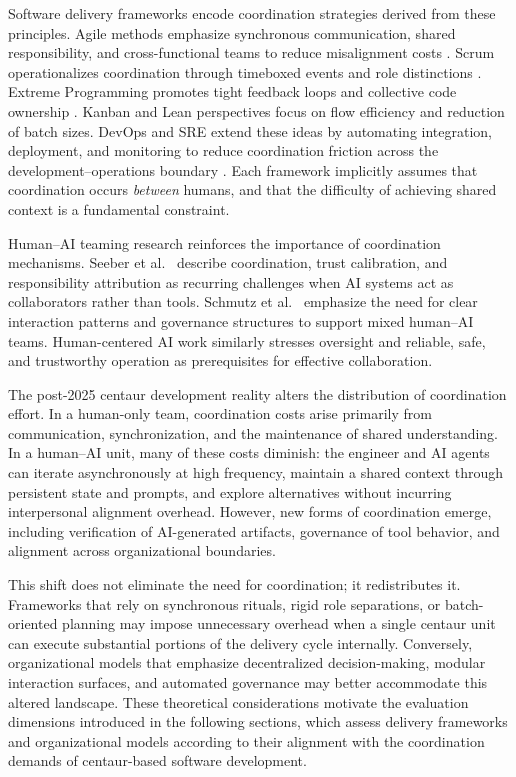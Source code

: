 \documentclass[11pt, a4paper, twocolumn]{article} %
\begin{document}
Software delivery frameworks encode coordination strategies derived from these
principles. Agile methods emphasize synchronous communication, shared
responsibility, and cross-functional teams to reduce misalignment costs
\citep{cockburn2001,highsmith2002agile}. Scrum operationalizes coordination
through timeboxed events and role distinctions \citep{schwaber2017scrum}. Extreme
Programming promotes tight feedback loops and collective code ownership
\citep{beck1999xp}. Kanban \citep{anderson2010kanban} and Lean perspectives focus
on flow efficiency and reduction of batch sizes. DevOps and SRE extend these
ideas by automating integration, deployment, and monitoring to reduce
coordination friction across the development--operations boundary
\citep{forsgren2018accelerate,humble2015leanenterprise}. Each framework implicitly
assumes that coordination occurs \emph{between} humans, and that the difficulty
of achieving shared context is a fundamental constraint.

\newpage

Human--AI teaming research reinforces the importance of coordination mechanisms.
Seeber et al.\ \citep{seeber2020machines} describe coordination, trust
calibration, and responsibility attribution as recurring challenges when AI
systems act as collaborators rather than tools. Schmutz et al.\
\citep{schmutz2024aiteaming} emphasize the need for clear interaction patterns
and governance structures to support mixed human--AI teams. Human-centered AI
work \citep{shneiderman2020human} similarly stresses oversight and reliable, safe, and trustworthy operation as prerequisites for effective collaboration.

The post-2025 centaur development reality alters the distribution of
coordination effort. In a human-only team, coordination costs arise primarily
from communication, synchronization, and the maintenance of shared
understanding. In a human--AI unit, many of these costs diminish: the engineer
and AI agents can iterate asynchronously at high frequency, maintain a shared
context through persistent state and prompts, and explore alternatives without
incurring interpersonal alignment overhead. However, new forms of coordination
emerge, including verification of AI-generated artifacts, governance of tool
behavior, and alignment across organizational boundaries.

This shift does not eliminate the need for coordination; it redistributes it.
Frameworks that rely on synchronous rituals, rigid role separations, or
batch-oriented planning may impose unnecessary overhead when a single centaur
unit can execute substantial portions of the delivery cycle internally.
Conversely, organizational models that emphasize decentralized decision-making,
modular interaction surfaces, and automated governance may better accommodate
this altered landscape. These theoretical considerations motivate the evaluation
dimensions introduced in the following sections, which assess delivery
frameworks and organizational models according to their alignment with the
coordination demands of centaur-based software development.
\end{document}
